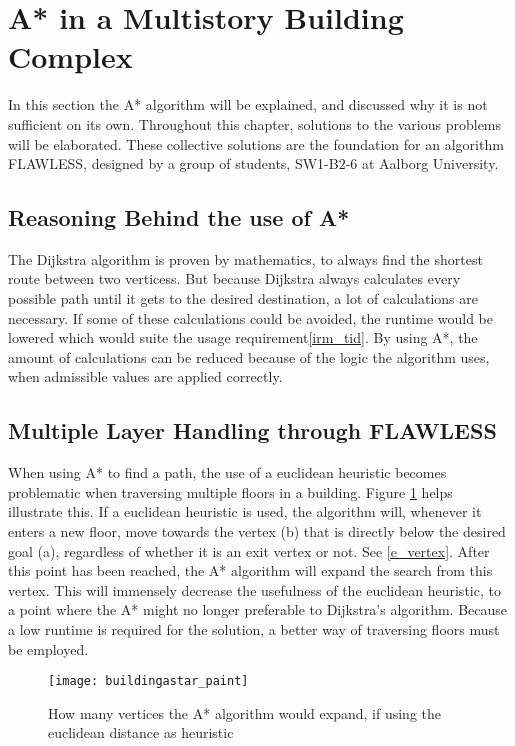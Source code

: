 \section{A* in a Multistory Building Complex}

In this section the A* algorithm will be explained, and discussed why it is not sufficient on its own. Throughout this chapter, solutions to the various problems will be elaborated. These collective solutions are the foundation for an algorithm FLAWLESS, designed by a group of students, SW1-B2-6 at Aalborg University. 

\subsection{Reasoning Behind the use of A*}
The Dijkstra algorithm is proven by mathematics, to always find the shortest route between two verticess. But because Dijkstra always calculates every possible path until it gets to the desired destination, a lot of calculations are necessary. If some of these calculations could be avoided, the runtime would be lowered which would suite the usage requirement\cref{irm_tid}. By using A*, the amount of calculations can be reduced because of the logic the algorithm uses, when admissible values are applied correctly.

\subsection{Multiple Layer Handling through FLAWLESS} \label{multlayhan}

When using A* to find a path, the use of a euclidean heuristic becomes problematic when traversing multiple floors in a building. Figure \ref{fig:buildingAstar} helps illustrate this. If a euclidean heuristic is used, the algorithm will, whenever it enters a new floor, move towards the vertex (b) that is directly below the desired goal (a), regardless of whether it is an exit vertex or not. See \cref{e_vertex}. After this point has been reached, the A* algorithm will expand the search from this vertex. This will immensely decrease the usefulness of the euclidean heuristic, to a point where the A* might no longer preferable to Dijkstra's algorithm. Because a low runtime is required for the solution, a better way of traversing floors must be employed.

\begin{figure}[ht!]
    \centering
    \texttt{[image: buildingastar\_paint]}
    \caption{How many vertices the A* algorithm would expand, if using the euclidean distance as heuristic}
    \label{fig:buildingAstar}
  \end{figure}

